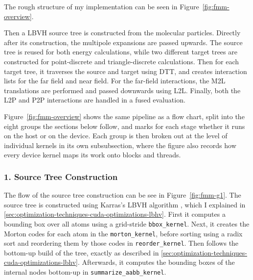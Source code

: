 The rough structure of my implementation can be seen in Figure~\ref{fig:fmm-overview}.

Then a LBVH source tree is constructed from the molecular particles.
Directly after its construction, the multipole expansions are passed upwards.
The source tree is reused for both energy calculations, while two different target trees are constructed for point-discrete and triangle-discrete calculations.
Then for each target tree, it traverses the source and target using DTT, and creates interaction lists for the far field and near field.
For the far-field interactions, the M2L translations are performed and passed downwards using L2L.
Finally, both the L2P and P2P interactions are handled in a fused evaluation.

Figure~\ref{fig:fmm-overview} shows the same pipeline as a flow chart, split into the eight groups the sections below follow, and marks for each stage whether it runs on the host or on the device.
Each group is then broken out at the level of individual kernels in its own subsubsection, where the figure also records how every device kernel maps its work onto blocks and threads.



\subsubsection{1. Source Tree Construction}

The flow of the source tree construction can be see in Figure~\ref{fig:fmm-g1}.
The source tree is constructed using Karras's LBVH algorithm \cite{karras2012lbvh}, which I explained in \ref{sec:optimization-techniques-cuda-optimizations-lbhv}.
First it computes a bounding box over all atoms using a grid-stride \texttt{bbox\_kernel}.
Next, it creates the Morton codes for each atom in the \texttt{morton\_kernel}, before sorting using a radix sort and reordering them by those codes in \texttt{reorder\_kernel}.
Then follows the bottom-up build of the tree, exactly as described in \ref{sec:optimization-techniques-cuda-optimizations-lbhv}.
Afterwards, it computes the bounding boxes of the internal nodes bottom-up in \texttt{summarize\_aabb\_kernel}.

